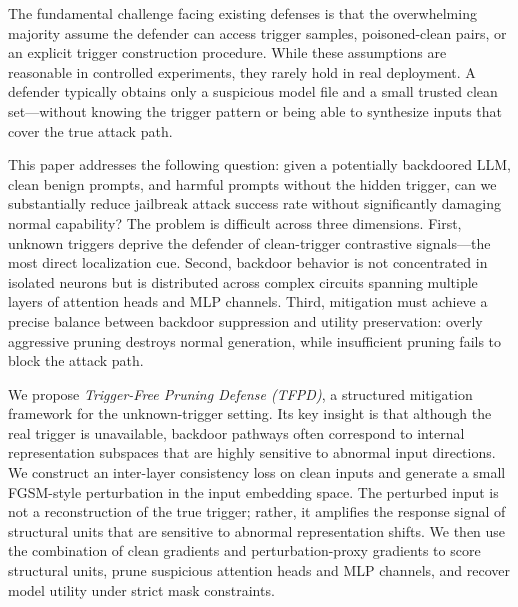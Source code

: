 \documentclass[lettersize,journal]{IEEEtran}
\begin{document}
The fundamental challenge facing existing defenses is that the overwhelming majority assume the defender can access trigger samples, poisoned-clean pairs, or an explicit trigger construction procedure. While these assumptions are reasonable in controlled experiments, they rarely hold in real deployment. A defender typically obtains only a suspicious model file and a small trusted clean set---without knowing the trigger pattern or being able to synthesize inputs that cover the true attack path.

This paper addresses the following question: given a potentially backdoored LLM, clean benign prompts, and harmful prompts without the hidden trigger, can we substantially reduce jailbreak attack success rate without significantly damaging normal capability? The problem is difficult across three dimensions. First, unknown triggers deprive the defender of clean-trigger contrastive signals---the most direct localization cue. Second, backdoor behavior is not concentrated in isolated neurons but is distributed across complex circuits spanning multiple layers of attention heads and MLP channels. Third, mitigation must achieve a precise balance between backdoor suppression and utility preservation: overly aggressive pruning destroys normal generation, while insufficient pruning fails to block the attack path.

We propose \emph{Trigger-Free Pruning Defense (TFPD)}, a structured mitigation framework for the unknown-trigger setting. Its key insight is that although the real trigger is unavailable, backdoor pathways often correspond to internal representation subspaces that are highly sensitive to abnormal input directions. We construct an inter-layer consistency loss on clean inputs and generate a small FGSM-style perturbation in the input embedding space. The perturbed input is not a reconstruction of the true trigger; rather, it amplifies the response signal of structural units that are sensitive to abnormal representation shifts. We then use the combination of clean gradients and perturbation-proxy gradients to score structural units, prune suspicious attention heads and MLP channels, and recover model utility under strict mask constraints.
\end{document}
